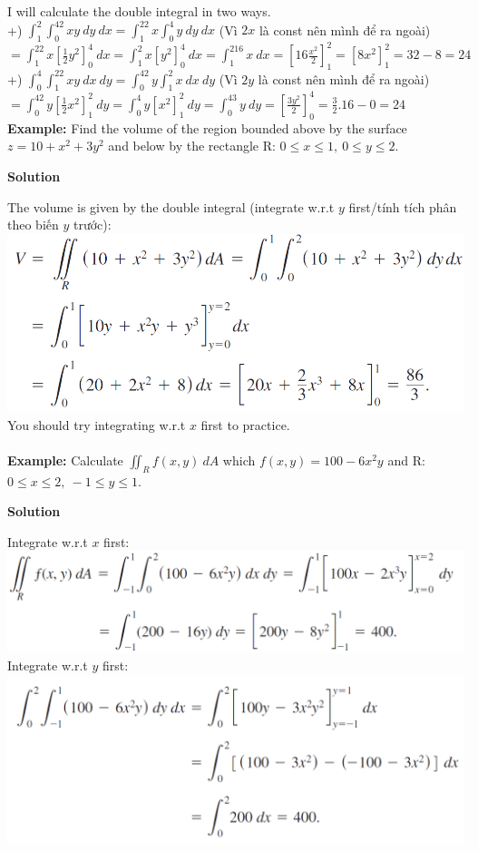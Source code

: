 \documentclass{article}
\begin{document}
I will calculate the double integral in two ways.\\
+) $\displaystyle\int_1^2\int_0^42xy\ dy\ dx
=\int_1^22x\int_0^4y\ dy\ dx$ (Vì $2x$ là const nên mình để ra ngoài)\\
$=\displaystyle\int_1^22x\left[\frac{1}{2}y^2\right]_0^4\ dx
=\int_1^2x\left[y^2\right]_0^4\ dx
=\int_1^216x\ dx
=\left[16\displaystyle\frac{x^2}{2}\right]_1^2=\left[8x^2\right]_1^2=32-8=24$\\
+) $\displaystyle\int_0^4\int_1^22xy\ dx\ dy
=\int_0^42y\int_1^2x\ dx\ dy$ (Vì $2y$ là const nên mình để ra ngoài)\\
$=\displaystyle\int_0^42y\left[\frac{1}{2}x^2\right]_1^2\ dy
=\int_0^4y\left[x^2\right]_1^2\ dy
=\int_0^43y\ dy=\left[\frac{3y^2}{2}\right]_0^4=\frac{3}{2}.16-0=24$\\
\textbf{Example:} Find the volume of the region bounded above by the surface $z=10+x^2+3y^2$ and below by the rectangle R: $0\le x \le 1,\ 0\le y\le 2$.
\begin{center}
    \textbf{Solution}
\end{center}
The volume is given by the double integral (integrate w.r.t $y$ first/tính tích phân theo biến $y$ trước):\\
\includegraphics[width=0.6\linewidth]{sol2.png}\\
You should try integrating w.r.t $x$ first to practice.\\\\
\textbf{Example:} Calculate $\displaystyle\iint_Rf(x,y)\ dA$ which $f(x,y)=100-6x^2y$ and R: $0\le x\le 2,\ -1\le y\le 1$.
\begin{center}
    \textbf{Solution}
\end{center}
Integrate w.r.t $x$ first:\\
\includegraphics[width=0.65\linewidth]{sol3.png}\\
Integrate w.r.t $y$ first:\\
\includegraphics[width=0.65\linewidth]{sol22.png}\\
\end{document}
